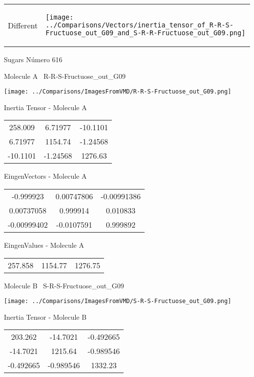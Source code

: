 \vtab[-5mm]
\begin{tabular}{*{2}{m{}}}
\begin{center}
\textcolor{NavyBlue}{\Large Different}
\end{center}
&
\begin{center}
\texttt{[image: ../Comparisons/Vectors/inertia\_tensor\_of\_R-R-S-Fructuose\_out\_G09\_and\_S-R-R-Fructuose\_out\_G09.png]}
\end{center}
\end{tabular}

 \newpage

\vtab[-3cm]
\begin{center}
{\large Sugars \tab Número 616}
\end{center}
\begin{multicols}{2}
\begin{center}

Molecule A \
R-R-S-Fructuose\_out\_G09

\texttt{[image: ../Comparisons/ImagesFromVMD/R-R-S-Fructuose\_out\_G09.png]}

Inertia Tensor - Molecule A \\
\begin{tabular}{|c c c|}
258.009	 & 	6.71977	 & 	-10.1101	 \\
6.71977	 & 	1154.74	 & 	-1.24568	 \\
-10.1101	 & 	-1.24568	 & 	1276.63
\end{tabular}

\vtab
 EingenVectors - Molecule A     \\
\begin{tabular}{|c c c|}
-0.999923	 & 	0.00747806	 & 	-0.00991386	 \\
0.00737058	 & 	0.999914	 & 	0.010833	 \\
-0.00999402	 & 	-0.0107591	 & 	0.999892
\end{tabular}

\vtab
 EingenValues - Molecule A     \\
\begin{tabular}{|c c c|}
257.858	 & 	1154.77	 & 	1276.75	 \\
\end{tabular}
\columnbreak

Molecule B \
S-R-S-Fructuose\_out\_G09

\texttt{[image: ../Comparisons/ImagesFromVMD/S-R-S-Fructuose\_out\_G09.png]}

Inertia Tensor - Molecule B \\
\begin{tabular}{|c c c|}
203.262	 & 	-14.7021	 & 	-0.492665	 \\
-14.7021	 & 	1215.64	 & 	-0.989546	 \\
-0.492665	 & 	-0.989546	 & 	1332.23
\end{tabular}


\end{center}
\end{multicols}
